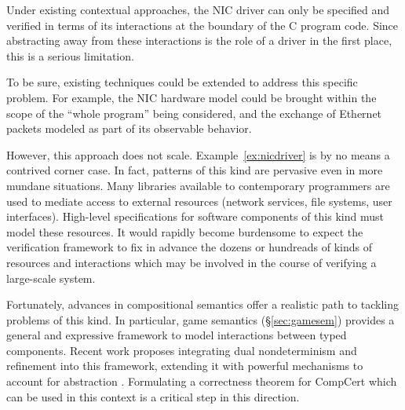 \documentclass[sigplan,10pt,review]{acmart}
\begin{document}
Under existing contextual approaches,
the NIC driver can only be specified and verified in terms of
its interactions at the boundary of the C program code.
Since abstracting away from these interactions
is the role of a driver in the first place,
this is a serious limitation.

To be sure,
existing techniques could be extended
to address this specific problem.
For example,
the NIC hardware model could be brought
within the scope of the ``whole program'' being considered,
and the exchange of Ethernet packets
modeled as part of its observable behavior.

However, this approach does not scale.
Example~\ref{ex:nicdriver}
is by no means a contrived corner case.
In fact, patterns of this kind are pervasive even in more mundane situations.
Many libraries available to contemporary programmers
are used to mediate access to external resources
(network services, file systems, user interfaces).
High-level specifications
for software components of this kind
must model these resources.
It would rapidly become burdensome to expect
the verification framework
to fix in advance
the dozens or hundreads
of kinds of resources and interactions
which may be involved
in the course of verifying a large-scale system.

Fortunately,
advances in compositional semantics
offer a realistic path
to tackling problems of this kind.
In particular,
game semantics (\S\ref{sec:gamesem})
provides a general and expressive framework
to model interactions between typed components.
Recent work proposes integrating
dual nondeterminism and refinement
into this framework,
extending it with powerful mechanisms
to account for abstraction \cite{rbgs-cal}.
Formulating
a correctness theorem for CompCert
which can be used in this context
is a critical step in this direction.

\end{document}
